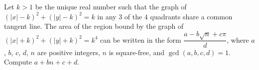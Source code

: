 Let $k>1$ be the unique real number such that the graph of $(|x|-k)^2+(|y|-k)^2=k$ in any $3$ of the $4$ quadrants share a common tangent line. The area of the region bound by the graph of $(|x|+k)^2+(|y|+k)^2=k^4$ can be written in the form $\dfrac{a-b\sqrt{n}+c\pi}{d}$, where $a$, $b$, $c$, $d$, $n$ are positive integers, $n$ is square-free, and $\gcd(a,b,c,d)=1$. Compute $a+bn+c+d$.
